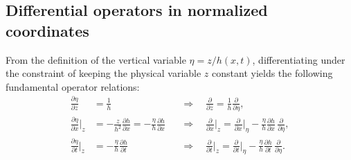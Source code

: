 \documentclass[lineno]{JFM-FLM_Au}
\begin{document}
\subsection{Differential operators in normalized coordinates}
From the definition of the vertical variable $\eta = z/h(x,t)$, differentiating under the constraint of keeping the physical variable $z$ constant yields the following fundamental operator relations:
\begin{align}
    \frac{\partial \eta}{\partial z} &= \frac{1}{h}
    &&\Longrightarrow\quad
    {\frac{\partial}{\partial z} = \frac{1}{h}\frac{\partial}{\partial \eta}}, \label{eq:dz}\\[6pt]
    \frac{\partial \eta}{\partial x}\bigg|_z &= -\frac{z}{h^2}\frac{\partial h}{\partial x} = -\frac{\eta}{h}\frac{\partial h}{\partial x}
    &&\Longrightarrow\quad
    {\frac{\partial}{\partial x}\bigg|_z = \frac{\partial}{\partial x}\bigg|_\eta - \frac{\eta}{h}\frac{\partial h}{\partial x}\,\frac{\partial}{\partial \eta}}, \label{eq:dx}\\[6pt]
    \frac{\partial \eta}{\partial t}\bigg|_z &= -\frac{\eta}{h}\frac{\partial h}{\partial t}
    &&\Longrightarrow\quad
    {\frac{\partial}{\partial t}\bigg|_z = \frac{\partial}{\partial t}\bigg|_\eta - \frac{\eta}{h}\frac{\partial h}{\partial t}\,\frac{\partial}{\partial \eta}}. \label{eq:dt}
\end{align}
\end{document}
